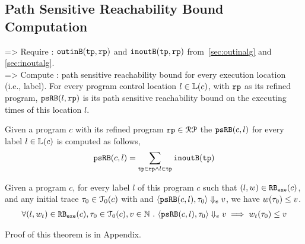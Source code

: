\subsection{Path Sensitive Reachability Bound Computation}
=> Require : ${\mathtt{outinB}}({\mathtt{tp}}, {\mathtt{rp}})$ and ${\mathtt{inoutB}}({\mathtt{tp}}, {\mathtt{rp}})$ from~\ref{sec:outinalg} and \ref{sec:inoutalg}.
\\
=> Compute : path sensitive reachability bound for every execution location (i.e., label).
For every program control location $l \in \mathbb{L}(c)$, with ${\mathtt{rp}}$ as its refined program,
 ${\mathtt{psRB}}(l, {\mathtt{rp}})$ is its path sensitive reachability bound on the executing times of this location $l$.
 \\
 \begin{defn}
  \label{def:label_psrb}
Given a program $c$ with its refined program ${\mathtt{rp}} \in \mathcal{RP}$
the ${\mathtt{psRB}}(c, l)$ for every label $l \in \mathbb{L}(c)$ is computed as follows,
\\
\[ {\mathtt{psRB}}(c, l) = \sum\limits_{{\mathtt{tp}} \in {\mathtt{rp}} \land 
l \in {\mathtt{tp}}} {\mathtt{inoutB}}({\mathtt{tp}})\]
 \end{defn}
\begin{thm}
  \label{thm:pathsensitive_rb_soundness}
Given a program ${c}$, for every label $l$ of this program $c$ such that $(l, w) \in {\mathtt{RB_{exe}}}(c)$, 
and any initial trace ${\mathtt{\tau}}_0 \in \mathcal{T}_0(c)$ with 
and $\langle {\mathtt{psRB}}(c, l), {\mathtt{\tau}}_0 \rangle \Downarrow_e v$,
we have $ w({\mathtt{\tau}}_0) \leq v $.
%
\[
  \begin{array}{l}
  \forall (l, w_{t}) \in {\mathtt{RB_{exe}}}(c),
  {\mathtt{\tau}}_0 \in \mathcal{T}_0(c), 
  v \in \mathbb{N} ~.~
  \langle {\mathtt{psRB}}(c, l), {\mathtt{\tau}}_0 \rangle \Downarrow_e v
  \implies
  w_{t}({\mathtt{\tau}}_0) \leq v
  \end{array}
\]
\end{thm}
%
Proof of this theorem is in Appendix.